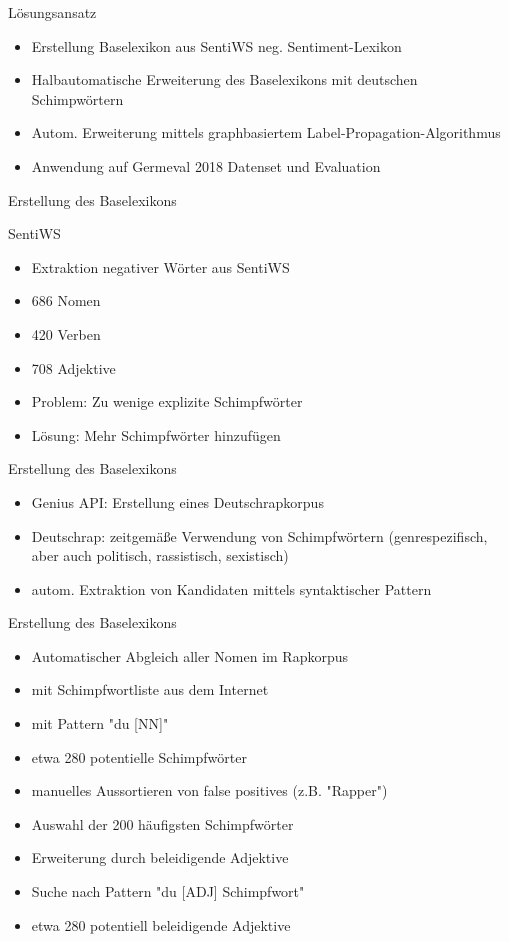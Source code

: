 \documentclass{beamer}
\begin{document}
\begin{frame}{Lösungsansatz}
\begin{itemize}
\item Erstellung Baselexikon aus SentiWS neg. Sentiment-Lexikon
\item Halbautomatische Erweiterung des Baselexikons mit deutschen Schimpwörtern
\item Autom. Erweiterung mittels graphbasiertem Label-Propagation-Algorithmus
\item Anwendung auf Germeval 2018 Datenset und Evaluation
\end{itemize}
\end{frame}
\begin{frame}{Erstellung des Baselexikons}
\begin{block}{SentiWS}
	\begin{itemize}
		\item Extraktion negativer Wörter aus SentiWS
		\item 686 Nomen
		\item 420 Verben
		\item 708 Adjektive
		\item Problem: Zu wenige explizite Schimpfwörter
		\item Lösung: Mehr Schimpfwörter hinzufügen
	\end{itemize}
\end{block}
\end{frame}

\begin{frame}{Erstellung des Baselexikons}
\begin{itemize}
\item Genius API: Erstellung eines Deutschrapkorpus 
\item Deutschrap: zeitgemäße Verwendung von Schimpfwörtern (genrespezifisch, aber auch politisch, rassistisch, sexistisch)
\item autom. Extraktion von Kandidaten mittels syntaktischer Pattern
\end{itemize}
\end{frame}

\begin{frame}{Erstellung des Baselexikons}
	\begin{itemize}
		\item Automatischer Abgleich aller Nomen im Rapkorpus
		\item mit Schimpfwortliste aus dem Internet
		\item mit Pattern "du [NN]"
		\item etwa 280 potentielle Schimpfwörter
		\item manuelles Aussortieren von false positives (z.B. "Rapper")
		\item Auswahl der 200 häufigsten Schimpfwörter
		\item Erweiterung durch beleidigende Adjektive
		\item Suche nach Pattern "du [ADJ] Schimpfwort"
		\item etwa 280 potentiell beleidigende Adjektive
	\end{itemize}
\end{frame}
\end{document}
